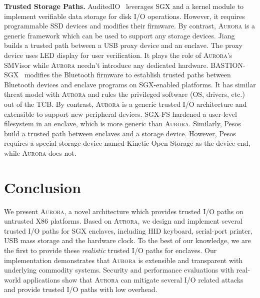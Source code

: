 \textbf{Trusted Storage Paths.}
AuditedIO~\cite{DBLP:conf/apsys/BalakrishnanCBS17} leverages SGX and a kernel module to implement verifiable data storage for disk I/O operations. However, it requires programmable SSD devices and modifies their firmware. %
By contrast, \textsc{Aurora} is a generic framework which can be used to support any storage devices. %
Jiang~\cite{Jang2017Building} builds a trusted path between a USB proxy device and an enclave. The proxy device uses LED display for user verification. It plays the role of  \textsc{Aurora}'s SMVisor while \textsc{Aurora} needn't introduce any dedicated hardware. %
BASTION-SGX~\cite{DBLP:conf/isca/PetersLVPK18} modifies the Bluetooth firmware to establish trusted  paths between Bluetooth  devices and enclave programs on SGX-enabled platforms. It has similar threat model with \textsc{Aurora} and rules the privileged software (OS, drivers, etc.) out of the TCB. %
By contrast, \textsc{Aurora} is a generic trusted I/O architecture and extensible to support new peripheral devices. %
SGX-FS \cite{DBLP:conf/cloudcom/BurihabwaFMS18} hardened a user-level filesystem in an enclave, which is more generic than \textsc{Aurora}. Similarly, Pesos~\cite{DBLP:conf/eurosys/KrahnTVKBF18} build a trusted path between enclaves and a storage device. However, Pesos requires a special storage device named Kinetic Open Storage as the device end, while \textsc{Aurora} does not.

\section{Conclusion}

We present \textsc{Aurora}, a novel architecture which provides trusted I/O paths on untrusted X86 platforms. Based on \textsc{Aurora}, we design and implement several trusted I/O paths for SGX enclaves, including HID keyboard, serial-port printer, USB mass storage and the hardware clock. To the best of our knowledge, we are the first to provide these \emph{realistic} trusted I/O paths for enclaves. Our implementation demonstrates that \textsc{Aurora} is extensible and transparent with underlying commodity systems. Security and performance evaluations with real-world applications show that \textsc{Aurora} can mitigate several I/O related attacks and provide trusted I/O paths with low overhead.

